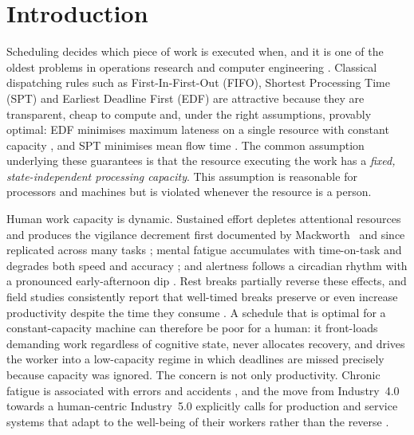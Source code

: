\section{Introduction}\label{sec:intro}

Scheduling decides which piece of work is executed when, and it is one of the oldest problems in operations research and computer engineering \cite{smith1956,jackson1955,graham1979,pinedo2016}. Classical dispatching rules such as First-In-First-Out (FIFO), Shortest Processing Time (SPT) and Earliest Deadline First (EDF) are attractive because they are transparent, cheap to compute and, under the right assumptions, provably optimal: EDF minimises maximum lateness on a single resource with constant capacity \cite{jackson1955,liu1973}, and SPT minimises mean flow time \cite{smith1956}. The common assumption underlying these guarantees is that the resource executing the work has a \emph{fixed, state-independent processing capacity}. This assumption is reasonable for processors and machines but is violated whenever the resource is a person.

Human work capacity is dynamic. Sustained effort depletes attentional resources and produces the vigilance decrement first documented by Mackworth~\cite{mackworth1948} and since replicated across many tasks \cite{warm2008,thomson2015,esterman2019}; mental fatigue accumulates with time-on-task and degrades both speed and accuracy \cite{boksem2008,lorist2000,hockey2013,ackerman2011}; and alertness follows a circadian rhythm with a pronounced early-afternoon dip \cite{akerstedt1997,monk2005,schmidt2007,blatter2007}. Rest breaks partially reverse these effects, and field studies consistently report that well-timed breaks preserve or even increase productivity despite the time they consume \cite{henning1997,dababneh2001,galinsky2000,tucker2003,albulescu2022}. A schedule that is optimal for a constant-capacity machine can therefore be poor for a human: it front-loads demanding work regardless of cognitive state, never allocates recovery, and drives the worker into a low-capacity regime in which deadlines are missed precisely because capacity was ignored. The concern is not only productivity. Chronic fatigue is associated with errors and accidents \cite{dawson1997,williamson2011}, and the move from Industry~4.0 towards a human-centric Industry~5.0 explicitly calls for production and service systems that adapt to the well-being of their workers rather than the reverse \cite{breque2021,xu2021,lu2022,leng2022,ivanov2023}.

